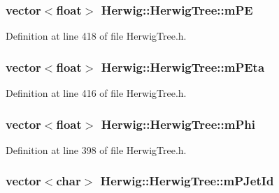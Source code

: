 \subsubsection[{\texorpdfstring{m\+PE}{mPE}}]{\setlength{\rightskip}{0pt plus 5cm}vector$<$float$>$ Herwig\+::\+Herwig\+Tree\+::m\+PE\hspace{0.3cm}{\ttfamily [protected]}}\hypertarget{class_herwig_1_1_herwig_tree_a1e002df7309a0a1cb10eae3b807e2d33}{}\label{class_herwig_1_1_herwig_tree_a1e002df7309a0a1cb10eae3b807e2d33}


Definition at line 418 of file Herwig\+Tree.\+h.

\subsubsection[{\texorpdfstring{m\+P\+Eta}{mPEta}}]{\setlength{\rightskip}{0pt plus 5cm}vector$<$float$>$ Herwig\+::\+Herwig\+Tree\+::m\+P\+Eta\hspace{0.3cm}{\ttfamily [protected]}}\hypertarget{class_herwig_1_1_herwig_tree_ab79e875b02024eb96d625b32a9e8943e}{}\label{class_herwig_1_1_herwig_tree_ab79e875b02024eb96d625b32a9e8943e}


Definition at line 416 of file Herwig\+Tree.\+h.

\subsubsection[{\texorpdfstring{m\+Phi}{mPhi}}]{\setlength{\rightskip}{0pt plus 5cm}vector$<$float$>$ Herwig\+::\+Herwig\+Tree\+::m\+Phi\hspace{0.3cm}{\ttfamily [protected]}}\hypertarget{class_herwig_1_1_herwig_tree_a9d3ad17856037f6b1d3229ed9086f636}{}\label{class_herwig_1_1_herwig_tree_a9d3ad17856037f6b1d3229ed9086f636}


Definition at line 398 of file Herwig\+Tree.\+h.

\subsubsection[{\texorpdfstring{m\+P\+Jet\+Id}{mPJetId}}]{\setlength{\rightskip}{0pt plus 5cm}vector$<$char$>$ Herwig\+::\+Herwig\+Tree\+::m\+P\+Jet\+Id\hspace{0.3cm}{\ttfamily [protected]}}\hypertarget{class_herwig_1_1_herwig_tree_a2959f5c6970dffaa74eeb606c650b04f}{}\label{class_herwig_1_1_herwig_tree_a2959f5c6970dffaa74eeb606c650b04f}


